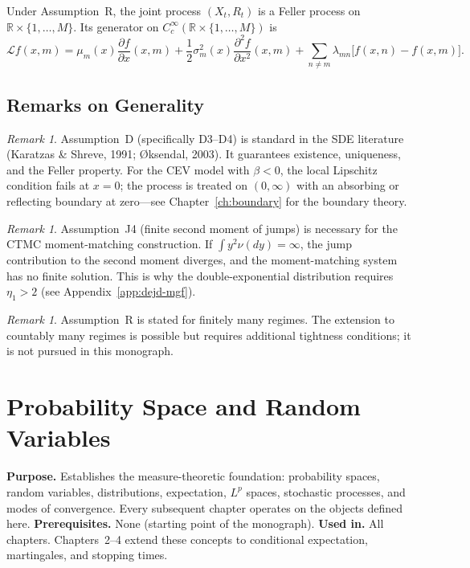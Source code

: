 \documentclass[11pt,a4paper,openany]{book}
\theoremstyle{definition}
\theoremstyle{plain}
\theoremstyle{remark}
\newtheorem{remark}[theorem]{Remark}
\newcommand{\1}{\mathbbm{1}}
\newcommand{\R}{\mathbb{R}}
\begin{document}
\noindent Under Assumption~R, the joint process $(X_{t}, R_{t})$ is a Feller process on $\R \times \{1,\ldots,M\}$. Its generator on $C_{c}^{\infty}(\R \times \{1,\ldots,M\})$ is
\[
\mathcal{L} f(x, m) = \mu_{m}(x) \frac{\partial f}{\partial x}(x,m) + \frac{1}{2} \sigma_{m}^{2}(x) \frac{\partial^{2} f}{\partial x^{2}}(x,m) + \sum_{n \neq m} \lambda_{mn} \bigl[f(x,n) - f(x,m)\bigr].
\]

\section{Remarks on Generality}

\begin{remark}
Assumption~D (specifically D3--D4) is standard in the SDE literature (Karatzas \& Shreve, 1991; \O ksendal, 2003). It guarantees existence, uniqueness, and the Feller property. For the CEV model with $\beta < 0$, the local Lipschitz condition fails at $x=0$; the process is treated on $(0,\infty)$ with an absorbing or reflecting boundary at zero---see Chapter~\ref{ch:boundary} for the boundary theory.
\end{remark}

\begin{remark}
Assumption~J4 (finite second moment of jumps) is necessary for the CTMC moment-matching construction. If $\int y^{2} \nu(dy) = \infty$, the jump contribution to the second moment diverges, and the moment-matching system has no finite solution. This is why the double-exponential distribution requires $\eta_{1} > 2$ (see Appendix~\ref{app:dejd-mgf}).
\end{remark}

\begin{remark}
Assumption~R is stated for finitely many regimes. The extension to countably many regimes is possible but requires additional tightness conditions; it is not pursued in this monograph.
\end{remark}

\newpage

\chapter{Probability Space and Random Variables}

\noindent\textbf{Purpose.} Establishes the measure-theoretic foundation: probability spaces, random variables, distributions, expectation, $L^{p}$ spaces, stochastic processes, and modes of convergence. Every subsequent chapter operates on the objects defined here.
\textbf{Prerequisites.} None (starting point of the monograph).
\textbf{Used in.} All chapters. Chapters~2--4 extend these concepts to conditional expectation, martingales, and stopping times.
\end{document}
